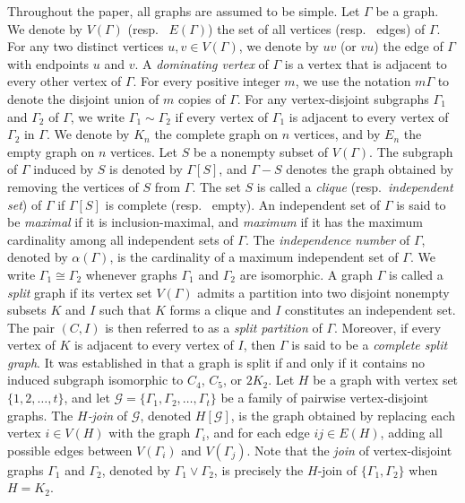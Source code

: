 \documentclass{amsart}
\theoremstyle{plain}
\theoremstyle{definition}
\begin{document}
\vspace{0.5mm}
Throughout the paper, all graphs are assumed to be simple. Let $\Gamma$ be a graph. We denote by $V(\Gamma)$ (resp.~ $E(\Gamma)$) the set of all vertices (resp.~ edges) of $\Gamma$. For any two distinct vertices $u,v \in V(\Gamma)$, we denote by $uv$ (or $vu$) the edge of $\Gamma$ with endpoints $u$ and $v$. A \emph{dominating vertex} of $\Gamma$ is a
vertex that is adjacent to every other vertex of $\Gamma$. For every positive integer $m$, we use the notation $m\Gamma$ to denote the disjoint union of $m$ copies of $\Gamma$. For any vertex-disjoint subgraphs $\Gamma_1$ and $\Gamma_2$ of $\Gamma$, we write $\Gamma_1 \sim \Gamma_2$ if every vertex of $\Gamma_1$ is adjacent to every vertex of $\Gamma_2$ in $\Gamma$. We denote by $K_n$ the complete graph on $n$ vertices, and by $E_n$ the empty graph on $n$ vertices. Let $S$ be a nonempty subset of $V(\Gamma)$. The subgraph of $\Gamma$ induced by $S$ is denoted by $\Gamma[S]$, and $\Gamma - S$ denotes the graph obtained by removing the vertices of $S$ from $\Gamma$. The set $S$ is called a \emph{clique} (resp.~\emph{independent set}) of $\Gamma$ if $\Gamma[S]$ is complete (resp.~ empty). An independent set of $\Gamma$ is said to be \emph{maximal} if it is inclusion-maximal, and \emph{maximum} if it has the maximum cardinality among all independent sets of $\Gamma$. The \emph{independence number} of $\Gamma$, denoted by $\alpha(\Gamma)$, is the cardinality of a maximum independent set of $\Gamma$. We write $\Gamma_1 \cong \Gamma_2$ whenever graphs $\Gamma_1$ and $\Gamma_2$ are isomorphic. A graph $\Gamma$ is called a \emph{split} graph if its vertex set $V(\Gamma)$ admits a partition into two disjoint nonempty subsets $K$ and $I$ such that $K$ forms a clique and $I$ constitutes an independent set. The pair $(C, I)$ is then referred to as a \emph{split partition} of $\Gamma$. Moreover, if every vertex of $K$ is adjacent to every vertex of $I$, then $\Gamma$ is said to be a \emph{complete split graph}. It was established in \cite{foldes-hammer-77} that a graph is split if and only if it contains no induced subgraph isomorphic to $C_4$, $C_5$, or $2K_2$. Let $H$ be a graph with vertex set $\{1,2,\dots,t\}$, and let 
$\mathcal{G}=\{\Gamma_1,\Gamma_2,\dots,\Gamma_t\}$ be a family of pairwise vertex‑disjoint graphs. The \emph{$H$‑join} of $\mathcal{G}$, denoted $H[\mathcal{G}]$, is the graph obtained by replacing each vertex $i\in V(H)$ with the graph $\Gamma_i$, and for each edge $ij\in E(H)$, adding all possible edges between $V(\Gamma_i)$ and $V(\Gamma_j)$. Note that the \emph{join} of vertex‑disjoint graphs $\Gamma_1$ and $\Gamma_2$, denoted by $\Gamma_1 \vee \Gamma_2$, is precisely the $H$‑join of $\{\Gamma_1,\Gamma_2\}$ when $H=K_2$.	
\end{document}
